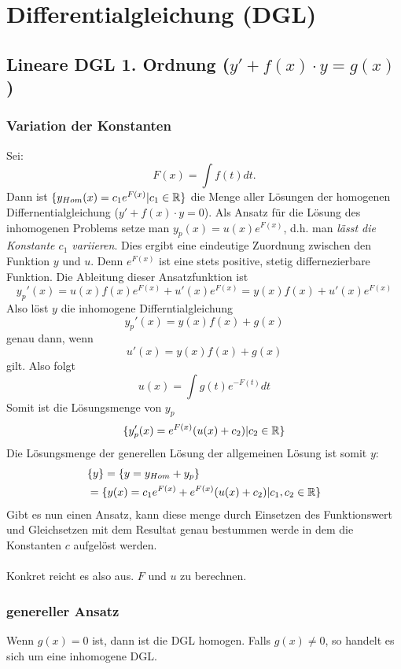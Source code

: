 \section{Differentialgleichung (DGL)}
\subsection{Lineare DGL 1. Ordnung ($y' + f(x) \cdot y = g(x)$)}
\subsubsection{Variation der Konstanten}
Sei:\[
F(x) = \int f(t) dt.
\]
Dann ist $\{y_{Hom}(x) = c_1e^{F(x)}| c_1 \in \mathbb{R}\}$ die Menge aller Lösungen der homogenen Differnentialgleichung ($y' + f(x) \cdot y = 0$). Als Ansatz für die Lösung des inhomogenen Problems setze man $y_p(x) = u(x)e^{F(x)}$, d.h. man \textit{lässt die Konstante $c_1$ variieren}. Dies ergibt eine eindeutige Zuordnung zwischen den Funktion $y$ und $u$. Denn $e^{F(x)}$ ist eine stets positive, stetig differnezierbare Funktion. Die Ableitung dieser Ansatzfunktion ist \[
y_p'(x) = u(x)f(x)e^{F(x)} + u'(x)e^{F(x)} = y(x)f(x) + u'(x)e^{F(x)}
\]
Also löst $y$ die inhomogene Differntialgleichung \[
y_p'(x) = y(x)f(x) + g(x)
\]
genau dann, wenn\[
u'(x) = y(x)f(x) + g(x)
\]
gilt. Also folgt\[
u(x) = \int  g(t)e^{-F(t)} dt
\]
Somit ist die Lösungsmenge von $y_p$
\[
\{ y_p'(x) = e^{F(x)} (u(x) + c_2) | c_2 \in \mathbb{R} \}
\]
Die Lösungsmenge der generellen Lösung der allgemeinen Lösung ist somit $y$:
\begin{align*}
&\{y\}=\{y = y_{Hom} + y_p\}\\
& =\{ y(x) =  c_1e^{F(x)} +  e^{F(x)} (u(x) + c_2) | c_1, c_2 \in \mathbb{R}\} 
\end{align*}
Gibt es nun einen Ansatz, kann diese menge durch Einsetzen des Funktionswert und Gleichsetzen mit dem Resultat genau bestummen werde in dem die Konstanten $c$  aufgelöst werden.\\
\\
Konkret reicht es also aus. $F$ und $u$ zu berechnen. 

\subsubsection{genereller Ansatz}
Wenn $g(x) = 0$ ist, dann ist die DGL homogen. Falls $g(x) \neq 0$, so handelt
es sich um eine inhomogene DGL.

